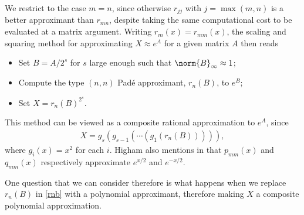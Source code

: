 We restrict to the case $m=n$, since otherwise $r_{jj}$ with $j=\max(m,n)$ is a better approximant than $r_{mn}$, despite taking the same computational cost to be evaluated at a matrix argument. Writing $r_m(x) = r_{mm}(x)$, the scaling and squaring method for approximating $X \approx e^A$ for a given matrix $A$ then reads
\begin{itemize}
    \item Set $B=A/2^s$ for $s$ large enough such that $\norm{B}_\infty \approx 1$;
    \item Compute the type $(n,n)$ Padé approximant, $r_n(B)$, to $e^B$;
    \item Set $X=r_n(B)^{2^s}.$
\end{itemize}
This method can be viewed as a composite rational approximation to $e^A$, since
\begin{align}
    X = g_s(g_{s-1}(\cdots(g_1(r_n(B))))), \label{rnb}
\end{align}
where $g_i(x)=x^2$ for each $i$. Higham also mentions in \cite{Higham} that $p_{mm}(x)$ and $q_{mm}(x)$ respectively approximate $e^{x/2}$ and $e^{-x/2}$.

\bigskip{}

One question that we can consider therefore is what happens when we replace $r_n(B)$ in \eqref{rnb} with a polynomial approximant, therefore making $X$ a composite polynomial approximation.  




